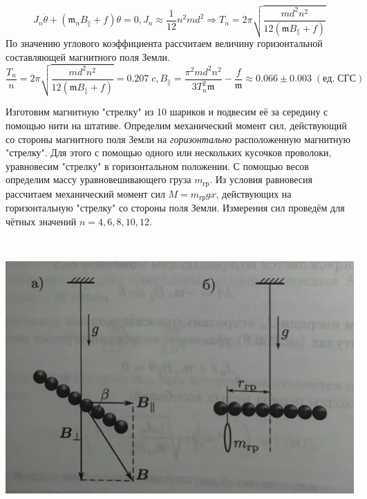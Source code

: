 \documentclass[a4paper,12pt]{article}
\begin{document}
 \[J_n \ddot\theta + (\mathfrak{m}_n B_{\|}+f)\theta = 0, J_n \approx \frac1{12}n^2md^2 \Rightarrow T_n = 2\pi \sqrt{ \frac{md^2n^2}{12(\mathfrak{m}B_{\|}+f)}}\]
По значению углового коэффициента рассчитаем величину горизонтальной составляющей магнитного поля Земли.
$$\frac{T_n}{n} = 2\pi \sqrt{ \frac{md^2n^2}{12(\mathfrak{m}B_{\|}+f)}} = 0.207 \; c, B_{\|} = \frac{\pi^2 md^2n^2}{3 T_n^2 \mathfrak{m}} - \frac f{\mathfrak {m}}\approx 0.066 \pm 0.003 \; (ед. \; СГС) $$

\newpage

\begin{minipage}{0.45\textwidth}

Изготовим магнитную "стрелку" из 10 шариков и подвесим её за середину с помощью нити на штативе.
Определим механический момент сил, действующий со стороны магнитного поля Земли на \textit{горизонтально} расположенную магнитную "стрелку". Для этого с помощью одного или нескольких кусочков проволоки, уравновесим "стрелку" в горизонтальном положении.
С помощью весов определим массу уравновешивающего груза $m_{гр}$.
Из условия равновесия рассчитаем механический момент сил $M = m_{гр}gx$, действующих на горизонтальную "стрелку"  со стороны поля Земли. Измерения сил проведём для чётных значений $n = 4,6,8,10,12$.
\end{minipage}
\begin{minipage}{0.05\textwidth}
\
\end{minipage}
\begin{minipage}{0.45\textwidth}
\begin{center}
\includegraphics[width=\linewidth]{4.jpg}\\
\end{center}
\end{minipage}
\end{document}
